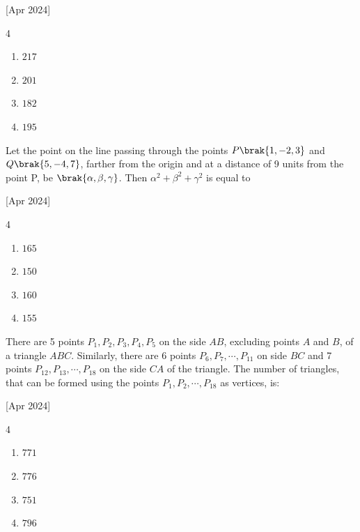     \hfill{[Apr 2024]}

        \begin{multicols}{4}
            \begin{enumerate}
                \item $217$
                \item $201$
                \item $182$
                \item $195$
            \end{enumerate}
        \end{multicols}

    \item Let the point on the line passing through the points $P\brak{1,-2,3}$ and $Q\brak{5,-4,7}$, farther from the origin and at a distance of 9 units from the point P, be $\brak{\alpha,\beta,\gamma}$. Then $\alpha^2+\beta^2+\gamma^2$ is equal to
    
    \hfill{[Apr 2024]}

        \begin{multicols}{4}
            \begin{enumerate}
                \item $165$
                \item $150$
                \item $160$
                \item $155$
            \end{enumerate}
        \end{multicols}
		
    \item There are 5 points $P_1,P_2,P_3,P_4,P_5$ on the side $AB$, excluding points $A$ and $B$, of a triangle $ABC$. Similarly, there are 6 points $P_6,P_7,\cdots,P_{11}$ on side $BC$ and 7 points $P_{12},P_{13},\cdots,P_{18}$ on the side $CA$ of the triangle. The number of triangles, that can be formed using the points $P_1,P_2,\cdots,P_{18}$ as vertices, is:
    
    \hfill{[Apr 2024]}

        \begin{multicols}{4}
            \begin{enumerate}
                \item $771$
                \item $776$
                \item $751$
                \item $796$
            \end{enumerate}
        \end{multicols}

